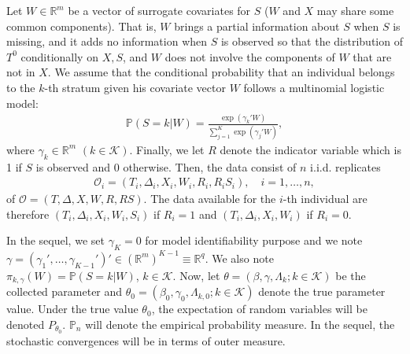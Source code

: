 \documentclass{statsoc}
\begin{document}
Let $W\in{\ensuremath{\mathbb{R}}}^m$ be a vector of surrogate covariates for $S$ ($W$ and $X$ may share some common components). That is, $W$ brings a partial information about $S$ when $S$ is missing, and it adds no information when $S$ is observed so that the distribution of $T^0$ conditionally on $X, S$, and $W$ does not involve the components of $W$ that are not in $X$. We assume that the conditional probability that an individual belongs to the $k$-th stratum given his covariate vector $W$ follows a multinomial logistic model:
\begin{eqnarray*}
\mathbb P(S=k|W)=\frac{\exp(\gamma_k'W)}{\sum_{j=1}^K\exp(\gamma_j'W)},
\end{eqnarray*}
where $\gamma_k\in\mathbb R^m$ $(k\in\mathcal K)$. Finally, we let $R$ denote the indicator variable which is 1 if $S$ is observed and 0 otherwise. Then, the data consist of $n$ i.i.d. replicates
\begin{eqnarray*}
\mathcal O_i=(T_i, \Delta_i, X_i, W_i, R_i, R_iS_i), \quad i=1,\ldots,n,
\end{eqnarray*}
of $\mathcal O=(T, \Delta, X, W, R, RS)$. The data available for the $i$-th individual are therefore $(T_i, \Delta_i, X_i, W_i, S_i)$ if $R_i=1$ and $(T_i, \Delta_i, X_i, W_i)$ if $R_i=0$.

In the sequel, we set $\gamma_K=0$ for model identifiability purpose and we note $\gamma=(\gamma_1',\ldots,\gamma_{K-1}')'\in({\ensuremath{\mathbb{R}}}^m)^{K-1}\equiv{\ensuremath{\mathbb{R}}}^q$. We also note $\pi_{k,\gamma}(W)=\mathbb P(S=k|W)$, $k\in\mathcal K$. Now, let $\theta=(\beta, \gamma, \Lambda_{k}; k\in\mathcal K)$ be the collected parameter and $\theta_0=(\beta_0, \gamma_0, \Lambda_{k,0}; k\in\mathcal K)$ denote the true parameter value. Under the true value $\theta_0$, the expectation of random variables will be denoted $P_{\theta_0}$. $\mathbb P_n$ will denote the empirical probability measure. In the sequel, the stochastic convergences will be in terms of outer measure.
\end{document}
